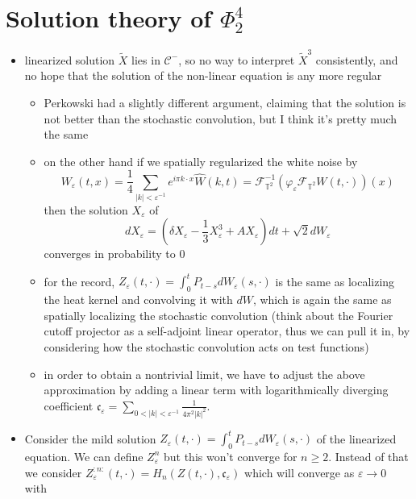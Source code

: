 \documentclass{report}
\theoremstyle{remark}
\theoremstyle{definition}
\let\epsilon\varepsilon
\begin{document}
\chapter{Solution theory of $\Phi^4_2$}
\begin{itemize}
  \item linearized solution $\tilde{X}$ lies in $\mathcal{C}^-$, so no way to interpret $\tilde{X}^3$ consistently, and no hope that the solution of the non-linear equation is any more regular
  \begin{itemize}
    \item Perkowski had a slightly different argument, claiming that the solution is not better than the stochastic convolution, but I think it's pretty much the same
    \item on the other hand if we spatially regularized the white noise by $$W_\epsilon(t, x) = \frac{1}{4}\sum_{\lvert k \rvert < \epsilon^{-1}} e^{i \pi k \cdot x}\hat{W}(k, t) = \mathcal{F}^{-1}_{\mathbb{T}^2}(\varphi_\epsilon \mathcal{F}_{\mathbb{T}^2}W(t, \cdot))(x)$$then the solution $X_\epsilon$ of $$dX_\epsilon = (\delta X_\epsilon - \frac{1}{3} X^3_\epsilon + A X_\epsilon) dt + \sqrt{2} dW_\epsilon$$converges in probability to $0$
    \item for the record, $Z_\epsilon(t, \cdot) = \int_0^t P_{t-s} dW_\epsilon(s, \cdot)$ is the same as localizing the heat kernel and convolving it with $dW$, which is again the same as spatially localizing the stochastic convolution (think about the Fourier cutoff projector as a self-adjoint linear operator, thus we can pull it in, by considering how the stochastic convolution acts on test functions)
    \item in order to obtain a nontrivial limit, we have to adjust the above approximation by adding a linear term with logarithmically diverging coefficient $\mathfrak{c}_\epsilon = \sum_{0 < |k| < \epsilon^{-1}}\frac{1}{4\pi^2 | k|^2}$.
  \end{itemize}
  \item Consider the mild solution $Z_\epsilon(t, \cdot) = \int_0^t P_{t-s} dW_\epsilon(s, \cdot)$ of the linearized equation. We can define $Z_\epsilon^n$ but this won't converge for $n \ge 2$. Instead of that we consider $Z^{:n:}_\epsilon(t, \cdot) = H_n(Z(t, \cdot), \mathfrak{c}_\epsilon)$ which will converge as $\epsilon \to 0$ with 
\end{itemize}
\end{document}
